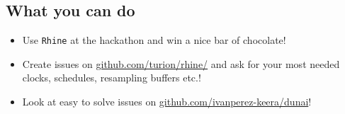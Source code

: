 \documentclass{enigtex-beamer-base}
\begin{document}
\subsection{What you can do}

\begin{frame}
	\begin{itemize}[<+->]
		\item Use \texttt{Rhine} at the hackathon and win a nice bar of chocolate!
		\item Create issues on \href{https://github.com/turion/rhine/}{github.com/turion/rhine/} and ask for your most needed clocks, schedules, resampling buffers etc.!
		\item Look at easy to solve issues on \href{https://github.com/ivanperez-keera/dunai}{github.com/ivanperez-keera/dunai}!
	\end{itemize}
\end{frame}
\end{document}
